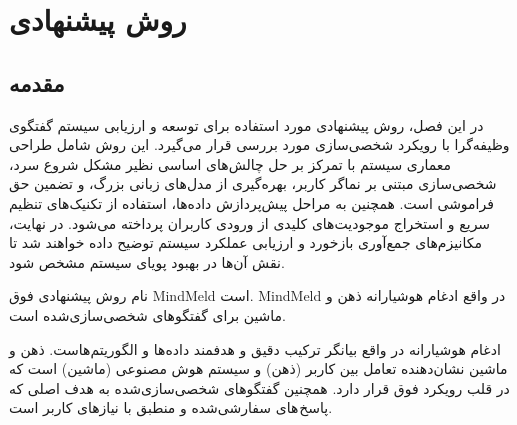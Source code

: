 \chapter{روش پیشنهادی}
\section{مقدمه} 
در این فصل، روش پیشنهادی مورد استفاده برای توسعه و ارزیابی سیستم گفتگوی وظیفه‌گرا با رویکرد شخصی‌سازی مورد بررسی قرار می‌گیرد. این روش شامل طراحی معماری سیستم با تمرکز بر حل چالش‌های اساسی نظیر مشکل شروع سرد، شخصی‌سازی مبتنی بر نماگر کاربر، بهره‌گیری از مدل‌های زبانی بزرگ، و تضمین حق فراموشی است. 
همچنین به مراحل پیش‌پردازش داده‌ها، استفاده از تکنیک‌های تنظیم سریع و استخراج موجودیت‌های کلیدی از ورودی کاربران پرداخته می‌شود. در نهایت، مکانیزم‌های جمع‌آوری بازخورد و ارزیابی عملکرد سیستم توضیح داده خواهند شد تا نقش آن‌ها در بهبود پویای سیستم مشخص شود.

نام روش پیشنهادی فوق MindMeld است. MindMeld در واقع ادغام هوشیارانه ذهن و ماشین برای گفتگوهای شخصی‌سازی‌شده است.


ادغام هوشیارانه در واقع بیانگر ترکیب دقیق و هدفمند داده‌ها و الگوریتم‌هاست. ذهن و ماشین نشان‌دهنده تعامل بین کاربر (ذهن) و سیستم هوش مصنوعی (ماشین) است که در قلب رویکرد فوق قرار دارد. همچنین گفتگوهای شخصی‌سازی‌شده به هدف اصلی که پاسخ های سفارشی‌شده و منطبق با نیازهای کاربر است.

